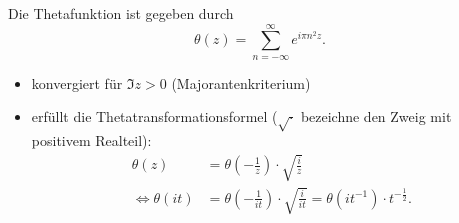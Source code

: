 \begin{frame}

    \begin{definition}
        Die Thetafunktion ist gegeben durch
        \[
            \theta(z) = \sum_{n = -\infty}^{\infty} e^{i\pi n^2z}.
        \]
    \end{definition}
    \begin{itemize}
        \item<2-> konvergiert für $\Im z > 0$ (Majorantenkriterium)
        \item<3-> erfüllt die Thetatransformationsformel ($\sqrt{\cdot}$ bezeichne den Zweig mit positivem Realteil): 
        \begin{align*}
            \theta(z) &= \theta\left(-\frac{1}{z}\right)\cdot \sqrt{\frac{i}{z}}\\
            \Leftrightarrow \theta(it) &= \theta\left(-\frac{1}{it}\right) \cdot \sqrt{\frac{i}{it}} = \theta\left(it^{-1}\right)\cdot t^{-\frac{1}{2}}.
        \end{align*}
        \end{itemize}
\end{frame}